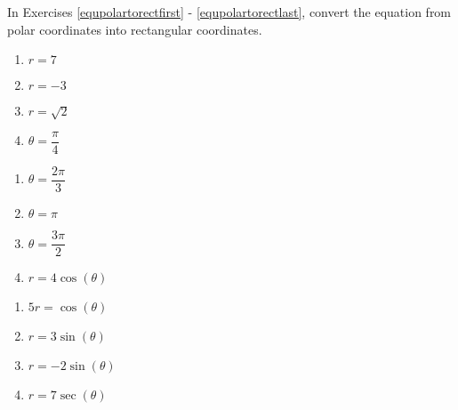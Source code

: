 In Exercises \ref{equpolartorectfirst} - \ref{equpolartorectlast}, convert the equation from polar coordinates into rectangular coordinates.  

\begin{multicols}{4}

\begin{enumerate}

\setcounter{enumi}{\value{HW}}

\item $r = 7$  \label{equpolartorectfirst}
\item $r = -3$ 
\item $r = \sqrt{2}$ 
\item $\theta = \dfrac{\pi}{4}$

\setcounter{HW}{\value{enumi}}

\end{enumerate}

\end{multicols}

\begin{multicols}{4} 

\begin{enumerate}

\setcounter{enumi}{\value{HW}}

\item $\theta = \dfrac{2\pi}{3}$
\item $\theta = \pi$ 
\item $\theta = \dfrac{3\pi}{2}$
\item $r = 4\cos(\theta)$ 

\setcounter{HW}{\value{enumi}}

\end{enumerate}

\end{multicols}

\begin{multicols}{4} 

\begin{enumerate}

\setcounter{enumi}{\value{HW}}

\item $5r = \cos(\theta)$
\item $r = 3\sin(\theta)$
\item $r = -2\sin(\theta)$ 
\item $r = 7\sec(\theta)$

\setcounter{HW}{\value{enumi}}

\end{enumerate}

\end{multicols}

